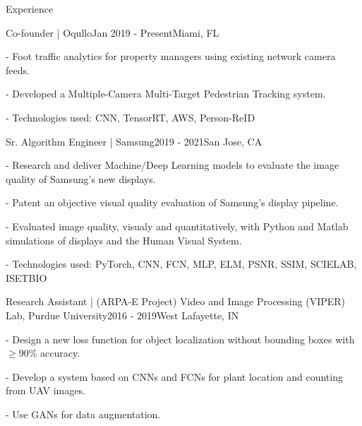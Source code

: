 \documentclass{resume} %
\begin{document}
% 



\vspace{-5pt}
\begin{rSection}{Experience}

\begin{rSubsection}{Co-founder | Oqullo}{Jan 2019 - Present}{}{Miami, FL}
\setlength{\itemindent}{.3in}
\item[-] Foot traffic analytics for property managers using existing network camera feeds.
\item[-] Developed a Multiple-Camera Multi-Target Pedestrian Tracking system.
\item[-] Technologies used: CNN, TensorRT, AWS, Person-ReID
\end{rSubsection}

\begin{rSubsection}{Sr. Algorithm Engineer | Samsung}{2019 - 2021}{}{San Jose, CA}
\setlength{\itemindent}{.3in}
\item[-] Research and deliver Machine/Deep Learning models to evaluate the image quality of Samsung's new displays.
\item[-] Patent an objective visual quality evaluation of Samsung's display pipeline.
\item[-] Evaluated image quality, visualy and quantitatively, with Python and Matlab simulations of displays and the Human Visual System.
\item[-] Technologies used: PyTorch, CNN, FCN, MLP, ELM, PSNR, SSIM, SCIELAB, ISETBIO
\end{rSubsection}


\begin{rSubsection}{Research Assistant | (ARPA-E Project) Video and Image Processing (VIPER) Lab, Purdue University}{2016 - 2019}{}{West Lafayette, IN}
\setlength{\itemindent}{.3in}
\item[-] Design a new loss function for object localization without bounding boxes with $ \ge 90\%$ accuracy.
\item[-] Develop a system based on CNNs and FCNs for plant location and counting from UAV images.
\item[-] Use GANs for data augmentation.
\end{rSubsection}



\end{rSection}
\end{document}
